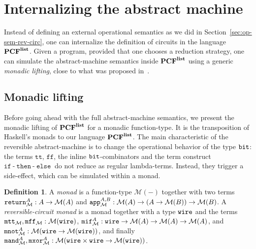 \documentclass{article}
\theoremstyle{plain}
\theoremstyle{definition}
\newtheorem{definition}[theorem]{Definition}
\newcommand{\PCF}{\mbox{${\bf PCF}^{\bf list}$}}
\newcommand{\bit}{{\tt bit}}
\newcommand{\define}[1]{{\em #1}}
\newcommand{\ttrue}{\mathtt{t\!t}}
\newcommand{\ffalse}{\mathtt{f\!f}}
\newcommand{\iftermx}[3]{{{\mathtt{if}}~{#1}~\mathtt{then}~{#2}~\mathtt{else}~{#3}}}
\newcommand{\monadreturn}{{\tt return}}
\newcommand{\monadapp}{{\tt app}}
\newcommand{\wiretype}{{\tt wire}}
\newcommand{\monadttrue}{{\tt mtt}}
\newcommand{\monadffalse}{{\tt mff}}
\newcommand{\monadif}{{\tt mif}}
\newcommand{\monadand}{{\tt mand}}
\newcommand{\monadxor}{{\tt mxor}}
\newcommand{\monadnot}{{\tt mnot}}
\begin{document}
\section{Internalizing the abstract machine}
\label{sec:internalizing}

Instead of defining an external operational semantics as we did in
Section~\ref{sec:op-sem-rev-circ}, one can internalize the definition
of circuits in the language \PCF{}. Given a program,
provided that one chooses a reduction strategy, one can simulate the
abstract-machine semantics inside \PCF{} using a generic {\em monadic
  lifting}, close to what was proposed in~\cite{MLmonad}.


\subsection{Monadic lifting}
\label{sec:monadic-lifting}

Before going ahead with the full abstract-machine semantics, we present the
monadic lifting of \PCF{} for a monadic function-type. It is the
transposition of Haskell's monads to our language \PCF{}. The main
characteristic of the reversible abstract-machine is to change the
operational behavior of the type $\bit$: the terms $\ttrue$,
$\ffalse$, the inline $\bit$-combinators and the term construct
$\iftermx{\!\textrm{-}\!}{\!\textrm{-}\!}{}$ do not reduce as regular lambda-terms. Instead,
they trigger a side-effect, which can be simulated within a
monad.


\begin{definition}\rm
  A \define{monad} is a function-type $\mathcal{M}(-)$ together with
  two terms $\monadreturn_{\mathcal{M}}^A : A \to \mathcal{M}(A)$ and
  $\monadapp_{\mathcal{M}}^{A,B} : \mathcal{M}(A) \to (A \to
  \mathcal{M}(B)) \to \mathcal{M}(B)$.
A \define{reversible-circuit monad} is a monad together with a type
  $\wiretype$ and the terms
  $\monadttrue_{\mathcal{M}},
  \monadffalse_{\mathcal{M}}:\mathcal{M}(\wiretype)$,
  $\monadif^{A}_{\mathcal{M}}:\wiretype\to\mathcal{M}(A)\to\mathcal{M}(A)\to\mathcal{M}(A)$,
  and
  $\monadnot^{A}_{\mathcal{M}}:\mathcal{M}(\wiretype\to\mathcal{M}(\wiretype))$,
  and finally $\monadand^{A}_{\mathcal{M}},\monadxor^{A}_{\mathcal{M}} : 
  \mathcal{M}(\wiretype\times\wiretype\to\mathcal{M}(\wiretype))
  $.
\end{definition}
\end{document}
